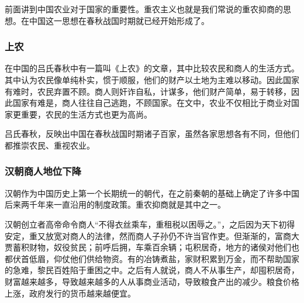 前面讲到中国农业对于国家的重要性。重农主义也就是我们常说的重农抑商的思想。在中国这一思想在春秋战国时期就已经开始形成了。

\subsubsection{上农}

在中国的吕氏春秋中有一篇叫《上农》的文章，其中比较农民和商人的生活方式。其中认为农民像单纯朴实，惯于顺服，他们的财产以土地为主难以移动。因此国家有难时，农民弃置不顾。商人则奸诈自私，计谋多，他们财产简单，易于转移，因此国家有难是，商人往往自己逃跑，不顾国家。在文中，农业不仅相比于商业对国家更重要，农民的生活方式也更为高尚。

吕氏春秋，反映出中国在春秋战国时期诸子百家，虽然各家思想各有不同，但他们都推崇农民、重视农业。

\subsubsection{汉朝商人地位下降}

汉朝作为中国历史上第一个长期统一的朝代，在之前秦朝的基础上确定了许多中国后来两千年来一直沿用的制度政策。重农抑商就是其中之一。

汉朝创立者高帝命令商人“不得衣丝乘车，重租税以困辱之。”，之后因为天下初得安定，重又放宽对商人的法律，然而商人子孙仍不许当官作吏。但渐渐的，富商大贾蓄积财物，奴役贫民；前呼后拥，车乘百余辆；屯积居奇，地方的诸侯对他们也都伏首低眉，仰仗他们供给物资。有的冶铸煮盐，家财积累到万金，而不帮助国家的急难，黎民百姓陷于重困之中。之后有人就说，商人不从事生产，却囤积居奇，财富越来越多，导致越来越多的人从事商业活动，导致粮食产出的减少。粮食价格上涨，政府发行的货币越来越便宜。

